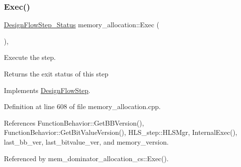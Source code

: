 \mbox{\label{classmemory__allocation_a2e53598d28bd9c5f3bc153b15a88759b}} 
\subsubsection{\texorpdfstring{Exec()}{Exec()}}
{\footnotesize\ttfamily \hyperlink{design__flow__step_8hpp_afb1f0d73069c26076b8d31dbc8ebecdf}{Design\+Flow\+Step\+\_\+\+Status} memory\+\_\+allocation\+::\+Exec (\begin{DoxyParamCaption}{ }\end{DoxyParamCaption})\hspace{0.3cm}{\ttfamily [override]}, {\ttfamily [virtual]}}



Execute the step. 

\begin{DoxyReturn}{Returns}
the exit status of this step 
\end{DoxyReturn}


Implements \hyperlink{classDesignFlowStep_a77d7e38493016766098711ea24f60b89}{Design\+Flow\+Step}.



Definition at line 608 of file memory\+\_\+allocation.\+cpp.



References Function\+Behavior\+::\+Get\+B\+B\+Version(), Function\+Behavior\+::\+Get\+Bit\+Value\+Version(), H\+L\+S\+\_\+step\+::\+H\+L\+S\+Mgr, Internal\+Exec(), last\+\_\+bb\+\_\+ver, last\+\_\+bitvalue\+\_\+ver, and memory\+\_\+version.



Referenced by mem\+\_\+dominator\+\_\+allocation\+\_\+cs\+::\+Exec().

